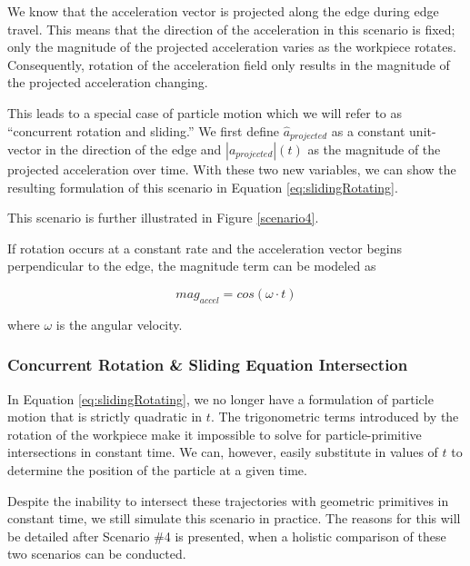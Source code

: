 We know that the acceleration vector is projected along the edge during edge travel. This means that the direction of the acceleration in this scenario is fixed; only the magnitude of the projected acceleration varies as the workpiece rotates. Consequently, rotation of the acceleration field only results in the magnitude of the projected acceleration changing.

This leads to a special case of particle motion which we will refer to as ``concurrent rotation and sliding.'' We first define $\hat{a}_{projected}$ as a constant unit-vector in the direction of the edge and $|a_{projected}|(t)$ as the magnitude of the projected acceleration over time. With these two new variables, we can show the resulting formulation of this scenario in Equation \eqref{eq:slidingRotating}.

 {
	\label{eq:slidingRotating}
}

This scenario is further illustrated in Figure \ref{scenario4}.


If rotation occurs at a constant rate and the acceleration vector begins perpendicular to the edge, the magnitude term can be modeled as

$$
mag_{accel} = cos(\omega \cdot t)
$$

where $\omega$ is the angular velocity.

		\subsubsection{Concurrent Rotation \& Sliding Equation Intersection}

In Equation \eqref{eq:slidingRotating}, we no longer have a formulation of particle motion that is strictly quadratic in $t$. The trigonometric terms introduced by the rotation of the workpiece make it impossible to solve for particle-primitive intersections in constant time. We can, however, easily substitute in values of $t$ to determine the position of the particle at a given time.

Despite the inability to intersect these trajectories with geometric primitives in constant time, we still simulate this scenario in practice. The reasons for this will be detailed after Scenario \#4 is presented, when a holistic comparison of these two scenarios can be conducted.

